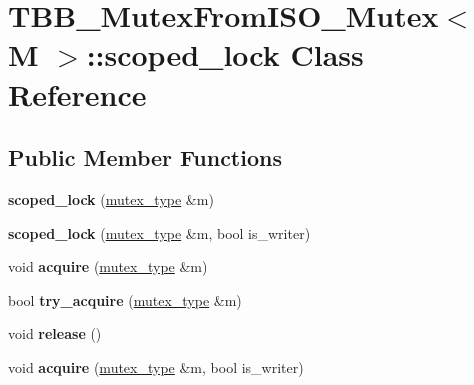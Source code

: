 \hypertarget{classTBB__MutexFromISO__Mutex_1_1scoped__lock}{}\section{T\+B\+B\+\_\+\+Mutex\+From\+I\+S\+O\+\_\+\+Mutex$<$ M $>$\+:\+:scoped\+\_\+lock Class Reference}
\label{classTBB__MutexFromISO__Mutex_1_1scoped__lock}
\subsection*{Public Member Functions}
\begin{DoxyCompactItemize}
\item 
\hypertarget{classTBB__MutexFromISO__Mutex_1_1scoped__lock_a8f9c2ae9ff92a11a7bf24002a4578cf5}{}{\bfseries scoped\+\_\+lock} (\hyperlink{classTBB__MutexFromISO__Mutex}{mutex\+\_\+type} \&m)\label{classTBB__MutexFromISO__Mutex_1_1scoped__lock_a8f9c2ae9ff92a11a7bf24002a4578cf5}

\item 
\hypertarget{classTBB__MutexFromISO__Mutex_1_1scoped__lock_ac21c44d99b9c5fb0ed39dd0fbaf961ae}{}{\bfseries scoped\+\_\+lock} (\hyperlink{classTBB__MutexFromISO__Mutex}{mutex\+\_\+type} \&m, bool is\+\_\+writer)\label{classTBB__MutexFromISO__Mutex_1_1scoped__lock_ac21c44d99b9c5fb0ed39dd0fbaf961ae}

\item 
\hypertarget{classTBB__MutexFromISO__Mutex_1_1scoped__lock_a10992f138883c109e99d83297e01c08a}{}void {\bfseries acquire} (\hyperlink{classTBB__MutexFromISO__Mutex}{mutex\+\_\+type} \&m)\label{classTBB__MutexFromISO__Mutex_1_1scoped__lock_a10992f138883c109e99d83297e01c08a}

\item 
\hypertarget{classTBB__MutexFromISO__Mutex_1_1scoped__lock_a47889132f96d6dbc2c3448c17c842e14}{}bool {\bfseries try\+\_\+acquire} (\hyperlink{classTBB__MutexFromISO__Mutex}{mutex\+\_\+type} \&m)\label{classTBB__MutexFromISO__Mutex_1_1scoped__lock_a47889132f96d6dbc2c3448c17c842e14}

\item 
\hypertarget{classTBB__MutexFromISO__Mutex_1_1scoped__lock_a794a704a1ca337afa0e0a292d12a0d19}{}void {\bfseries release} ()\label{classTBB__MutexFromISO__Mutex_1_1scoped__lock_a794a704a1ca337afa0e0a292d12a0d19}

\item 
\hypertarget{classTBB__MutexFromISO__Mutex_1_1scoped__lock_aa3cfe06e841e56ea69d2853daac8aea8}{}void {\bfseries acquire} (\hyperlink{classTBB__MutexFromISO__Mutex}{mutex\+\_\+type} \&m, bool is\+\_\+writer)\label{classTBB__MutexFromISO__Mutex_1_1scoped__lock_aa3cfe06e841e56ea69d2853daac8aea8}


\end{DoxyCompactItemize}
